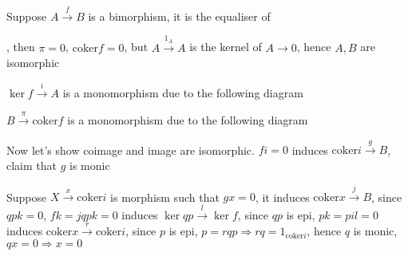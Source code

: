 \documentclass[main]{subfiles}
\begin{document}
\begin{solution}
Suppose $A\xrightarrow{f}B$ is a bimorphism, it is the equaliser of , then $\pi=0$, $\mathrm{coker}f=0$, but $A\xrightarrow{1_A}A$ is the kernel of $A\to0$, hence $A,B$ are isomorphic \par
$\ker f\xrightarrow{i}A$ is a monomorphism due to the following diagram
\begin{center}
\end{center}
$B\xrightarrow{\pi}\mathrm{coker}f$ is a monomorphism due to the following diagram
\begin{center}
\end{center}
Now let's show coimage and image are isomorphic. $fi=0$ induces $\mathrm{coker}i\xrightarrow{g}B$, claim that $g$ is monic \par
Suppose $X\xrightarrow{x}\mathrm{coker}i$ is morphism such that $gx=0$, it induces $\mathrm{coker}x\xrightarrow{j}B$, since $qpk=0$, $fk=jqpk=0$ induces $\ker qp\xrightarrow{l}\ker f$, since $qp$ is epi, $pk=pil=0$ induces $\mathrm{coker}x\xrightarrow{r}\mathrm{coker}i$, since $p$ is epi, $p=rqp\Rightarrow rq=1_{\mathrm{coker}i}$, hence $q$ is monic, $qx=0\Rightarrow x=0$
\begin{center}
\end{center}
\end{solution}
\end{document}
